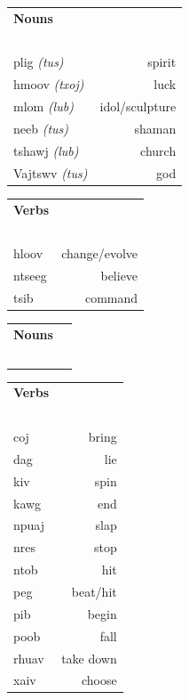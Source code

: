 \documentclass{article}
\begin{document}
\begin{multicols}{2}
[
\section*{}
]

\begin{tabular}{l r}
\textbf{Nouns} \\
~\\
plig {\em (tus)} &spirit\\
hmoov {\em (txoj)} &luck\\
mlom {\em (lub)} &idol/sculpture\\
neeb {\em (tus)} &shaman\\
tshawj {\em (lub)} &church\\
Vajtswv {\em (tus)} &god\\
\end{tabular}

\begin{tabular}{l r}
\textbf{Verbs} \\
~\\
hloov &change/evolve\\
ntseeg &believe\\
tsib &command\\
\end{tabular}
\end{multicols}

\clearpage

\begin{multicols}{2}
[
\section*{}
]

\begin{tabular}{l r}
\textbf{Nouns} \\
~\\

\end{tabular}

\begin{tabular}{l r}
\textbf{Verbs} \\
~\\
coj &bring\\
dag &lie\\
kiv &spin\\
kawg &end\\
npuaj &slap\\
nres &stop\\
ntob &hit\\
peg &beat/hit\\
pib &begin\\
poob &fall\\
rhuav &take down\\
xaiv &choose\\
\end{tabular}
\end{multicols}
\end{document}
